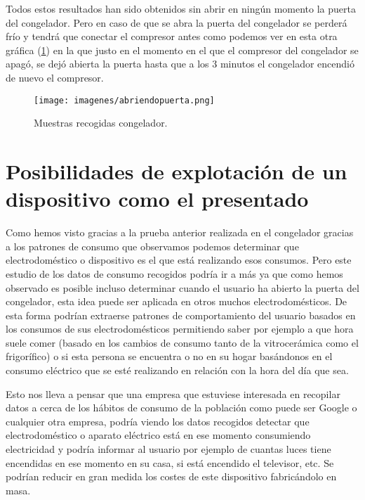 Todos estos resultados han sido obtenidos sin abrir en ningún momento la puerta del congelador. Pero en caso de que se abra la puerta del congelador se perderá frío y tendrá que conectar el compresor antes como podemos ver en esta otra gráfica (\ref{fig:abriendopuerta}) en la que justo en el momento en el que el compresor del congelador se apagó, se dejó abierta la puerta hasta que a los 3 minutos el congelador encendió de nuevo el compresor.

\begin{figure}[H]
	\centering
	\texttt{[image: imagenes/abriendopuerta.png]}
	\caption{Muestras recogidas congelador.}
	\label{fig:abriendopuerta}
\end{figure}

\section{Posibilidades de explotación de un dispositivo como el presentado}

Como hemos visto gracias a la prueba anterior realizada en el congelador gracias a los patrones de consumo que observamos podemos determinar que electrodoméstico o dispositivo es el que está realizando esos consumos. Pero este estudio de los datos de consumo recogidos podría ir a más ya que como hemos observado es posible incluso determinar cuando el usuario ha abierto la puerta del congelador, esta idea puede ser aplicada en otros muchos electrodomésticos. De esta forma podrían extraerse patrones de comportamiento del usuario basados en los consumos de sus electrodomésticos permitiendo saber por ejemplo a que hora suele comer (basado en los cambios de consumo tanto de la vitrocerámica como el frigorífico) o si esta persona se encuentra o no en su hogar basándonos en el consumo eléctrico que se esté realizando en relación con la hora del día que sea.

Esto nos lleva a pensar que una empresa que estuviese interesada en recopilar datos a cerca de los hábitos de consumo de la población como puede ser Google o cualquier otra empresa, podría viendo los datos recogidos detectar que electrodoméstico o aparato eléctrico está en ese momento consumiendo electricidad y podría informar al usuario por ejemplo de cuantas luces tiene encendidas en ese momento en su casa, si está encendido el televisor, etc. Se podrían reducir en gran medida los costes de este dispositivo fabricándolo en masa.